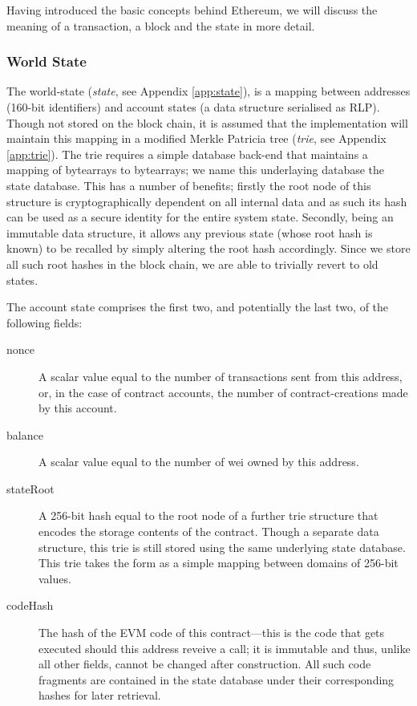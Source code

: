 \documentclass[9pt,oneside]{amsart}
\begin{document}
\begin{multicols}{2}
Having introduced the basic concepts behind Ethereum, we will discuss the meaning of a transaction, a block and the state in more detail.

\subsubsection{World State} \label{ch:state}

The world-state (\textit{state}, see Appendix \ref{app:state}), is a mapping between addresses (160-bit identifiers) and account states (a data structure serialised as RLP). Though not stored on the block chain, it is assumed that the implementation will maintain this mapping in a modified Merkle Patricia tree (\textit{trie}, see Appendix \ref{app:trie}). The trie requires a simple database back-end that maintains a mapping of bytearrays to bytearrays; we name this underlaying database the state database. This has a number of benefits; firstly the root node of this structure is cryptographically dependent on all internal data and as such its hash can be used as a secure identity for the entire system state. Secondly, being an immutable data structure, it allows any previous state (whose root hash is known) to be recalled by simply altering the root hash accordingly. Since we store all such root hashes in the block chain, we are able to trivially revert to old states.

The account state comprises the first two, and potentially the last two, of the following fields:

\begin{description}
\item[nonce] A scalar value equal to the number of transactions sent from this address, or, in the case of contract accounts, the number of contract-creations made by this account.
\item[balance] A scalar value equal to the number of wei owned by this address.
\item[stateRoot] A 256-bit hash equal to the root node of a further trie structure that encodes the storage contents of the contract. Though a separate data structure, this trie is still stored using the same underlying state database. This trie takes the form as a simple mapping between domains of 256-bit values.
\item[codeHash] The hash of the EVM code of this contract---this is the code that gets executed should this address reveive a call; it is immutable and thus, unlike all other fields, cannot be changed after construction. All such code fragments are contained in the state database under their corresponding hashes for later retrieval.
\end{description}


\end{multicols}
\end{document}
